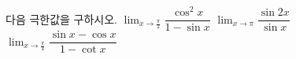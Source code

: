 다음 극한값을 구하시오.
 $\displaystyle\lim_{x\to\frac{\pi}{2}}\dfrac{\cos^2 x}{1-\sin x}$
 $\displaystyle\lim_{x\to\pi}\dfrac{\sin 2x}{\sin x}$
 $\displaystyle\lim_{x\to\frac{\pi}{4}}\dfrac{\sin x-\cos x}{1-\cot x}$
